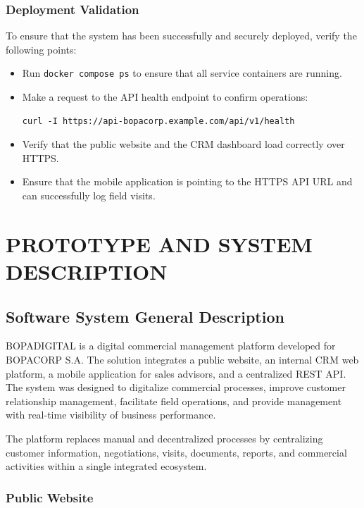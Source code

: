 \documentclass[letterpaper%
, oneside%
, 12pt%
, memoireprojet%
, english%
,creativecommons,hyperref, withAlgo2e %
]{thETS}
\begin{document}
\subsection{Deployment Validation}
To ensure that the system has been successfully and securely deployed, verify the following points:
\begin{itemize}
\item Run \texttt{docker compose ps} to ensure that all service containers are running.
\item Make a request to the API health endpoint to confirm operations:
\begin{verbatim}
curl -I https://api-bopacorp.example.com/api/v1/health
\end{verbatim}
\item Verify that the public website and the CRM dashboard load correctly over HTTPS.
\item Ensure that the mobile application is pointing to the HTTPS API URL and can successfully log field visits.
\end{itemize}


\chapter{PROTOTYPE AND SYSTEM DESCRIPTION}

\section{Software System General Description}

BOPADIGITAL is a digital commercial management platform developed for BOPACORP S.A. The solution integrates a public website, an internal CRM web platform, a mobile application for sales advisors, and a centralized REST API. The system was designed to digitalize commercial processes, improve customer relationship management, facilitate field operations, and provide management with real-time visibility of business performance.

The platform replaces manual and decentralized processes by centralizing customer information, negotiations, visits, documents, reports, and commercial activities within a single integrated ecosystem.

\subsection{Public Website}
\end{document}
